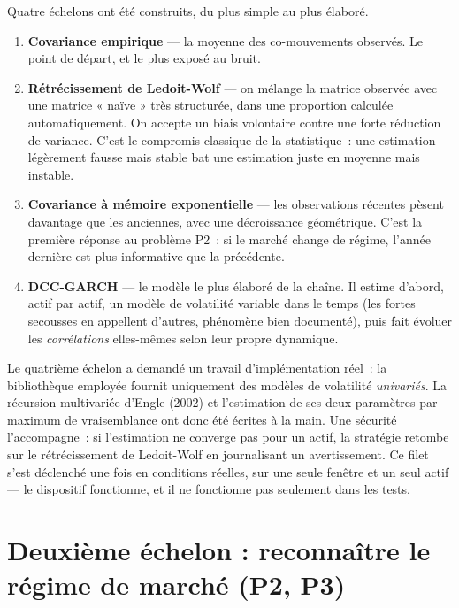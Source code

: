 Quatre échelons ont été construits, du plus simple au plus élaboré.

\begin{enumerate}
  \item \textbf{Covariance empirique} — la moyenne des co-mouvements observés.
        Le point de départ, et le plus exposé au bruit.
  \item \textbf{Rétrécissement de Ledoit-Wolf} — on mélange la matrice observée
        avec une matrice « naïve » très structurée, dans une proportion
        calculée automatiquement. On accepte un biais volontaire contre une
        forte réduction de variance. C'est le compromis classique de la
        statistique~: une estimation légèrement fausse mais stable bat une
        estimation juste en moyenne mais instable.
  \item \textbf{Covariance à mémoire exponentielle} — les observations récentes
        pèsent davantage que les anciennes, avec une décroissance géométrique.
        C'est la première réponse au problème P2~: si le marché change de
        régime, l'année dernière est plus informative que la précédente.
  \item \textbf{DCC-GARCH} — le modèle le plus élaboré de la chaîne. Il estime
        d'abord, actif par actif, un modèle de volatilité variable dans le
        temps (les fortes secousses en appellent d'autres, phénomène bien
        documenté), puis fait évoluer les \emph{corrélations} elles-mêmes selon
        leur propre dynamique.
\end{enumerate}

\begin{remarquebox}
Le quatrième échelon a demandé un travail d'implémentation réel~: la
bibliothèque employée fournit uniquement des modèles de volatilité
\emph{univariés}. La récursion multivariée d'Engle (2002) et l'estimation de ses
deux paramètres par maximum de vraisemblance ont donc été écrites à la main. Une
sécurité l'accompagne~: si l'estimation ne converge pas pour un actif, la
stratégie retombe sur le rétrécissement de Ledoit-Wolf en journalisant un
avertissement. Ce filet s'est déclenché une fois en conditions réelles, sur une
seule fenêtre et un seul actif — le dispositif fonctionne, et il ne fonctionne
pas seulement dans les tests.
\end{remarquebox}

\section{Deuxième échelon : reconnaître le régime de marché (P2, P3)}


